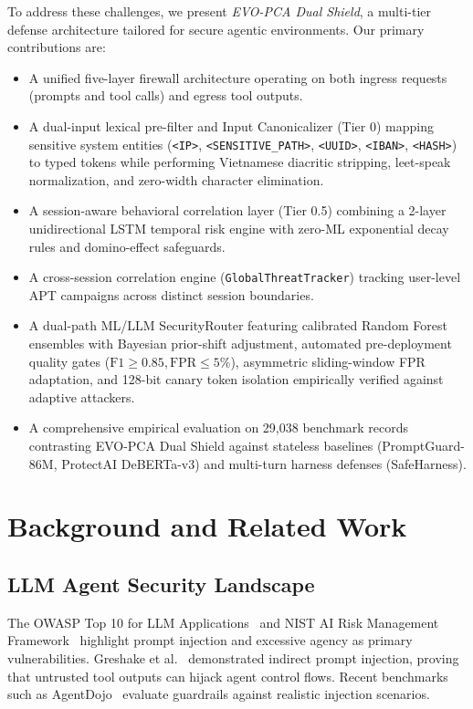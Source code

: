 \documentclass[runningheads]{llncs}
\begin{document}
To address these challenges, we present \textit{EVO-PCA Dual Shield}, a multi-tier defense architecture tailored for secure agentic environments. Our primary contributions are:
\begin{itemize}
    \item A unified five-layer firewall architecture operating on both ingress requests (prompts and tool calls) and egress tool outputs.
    \item A dual-input lexical pre-filter and Input Canonicalizer (Tier 0) mapping sensitive system entities (\texttt{<IP>}, \texttt{<SENSITIVE\_PATH>}, \texttt{<UUID>}, \texttt{<IBAN>}, \texttt{<HASH>}) to typed tokens while performing Vietnamese diacritic stripping, leet-speak normalization, and zero-width character elimination.
    \item A session-aware behavioral correlation layer (Tier 0.5) combining a 2-layer unidirectional LSTM temporal risk engine with zero-ML exponential decay rules and domino-effect safeguards.
    \item A cross-session correlation engine (\texttt{GlobalThreatTracker}) tracking user-level APT campaigns across distinct session boundaries.
    \item A dual-path ML/LLM SecurityRouter featuring calibrated Random Forest ensembles with Bayesian prior-shift adjustment, automated pre-deployment quality gates ($\text{F1} \ge 0.85, \text{FPR} \le 5\%$), asymmetric sliding-window FPR adaptation, and 128-bit canary token isolation empirically verified against adaptive attackers.
    \item A comprehensive empirical evaluation on 29,038 benchmark records contrasting EVO-PCA Dual Shield against stateless baselines (PromptGuard-86M, ProtectAI DeBERTa-v3) and multi-turn harness defenses (SafeHarness).
\end{itemize}

\section{Background and Related Work}
\subsection{LLM Agent Security Landscape}
The OWASP Top 10 for LLM Applications~\cite{owasp2023} and NIST AI Risk Management Framework~\cite{nist2023} highlight prompt injection and excessive agency as primary vulnerabilities. Greshake et al.~\cite{greshake2023not} demonstrated indirect prompt injection, proving that untrusted tool outputs can hijack agent control flows. Recent benchmarks such as AgentDojo~\cite{agentdojo2024} evaluate guardrails against realistic injection scenarios.
\end{document}
